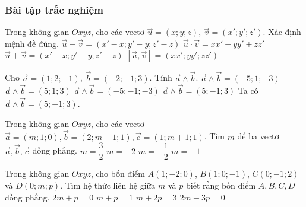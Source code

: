 \subsubsection{Bài tập trắc nghiệm}
\begin{ex}%
	Trong không gian $Oxyz$, cho các vectơ $\overrightarrow{u}=(x;y;z)$, $\overrightarrow{v}=(x';y';z')$. Xác định mệnh đề đúng.
	\choice
	{$\overrightarrow{u}-\overrightarrow{v}=(x'-x;y'-y;z'-z)$}
	{\True $\overrightarrow{u}\cdot\overrightarrow{v}=xx'+yy'+zz'$}
	{$\overrightarrow{u}+\overrightarrow{v}=(x'-x;y'-y;z'-z)$}
	{$\left[\overrightarrow{u},\overrightarrow{v}\right]=(xx';yy';zz')$}
\end{ex}
\begin{ex}%
	Cho $\vec{a}=(1;2;-1)$, $\vec{b}=(-2;-1;3)$. Tính $\vec{a}\wedge\vec{b}$.
	\choice
	{$\vec{a}\wedge\vec{b}=(-5;1;-3)$}
	{$\vec{a}\wedge\vec{b}=(5;1;3)$}
	{$\vec{a}\wedge\vec{b}=(-5;-1;-3)$}
	{\True $\vec{a}\wedge\vec{b}=(5;-1;3)$}
	\loigiai
	{
		Ta có $\vec{a}\wedge\vec{b}=(5;-1;3)$.
	}
\end{ex}
\begin{ex}%
	Trong không gian $Oxyz$, cho các vectơ $\overrightarrow a=(m;1;0),\overrightarrow b=(2;m-1;1),\overrightarrow{c}=(1;m+1;1)$. Tìm $m$ để ba vectơ $\overrightarrow a ,\overrightarrow b ,\overrightarrow c$ đồng phẳng.
	\choice
	{$m=\dfrac{3}{2}$}
	{$m=-2$}
	{\True $m=-\dfrac{1}{2}$}
	{$m=-1$}
\end{ex}
\begin{ex}%
	Trong không gian $Oxyz$, cho bốn điểm $A(1;-2;0)$, $B(1;0;-1)$, $C(0;-1;2)$ và $D(0;m;p)$. Tìm hệ thức liên hệ giữa $m$ và $p$ biết rằng bốn điểm $A,B,C,D$ đồng phẳng.
	\choice
	{$2m+p=0$}
	{$m+p=1$}
	{\True $m+2p=3$}
	{$2m-3p=0$} 
\end{ex}

